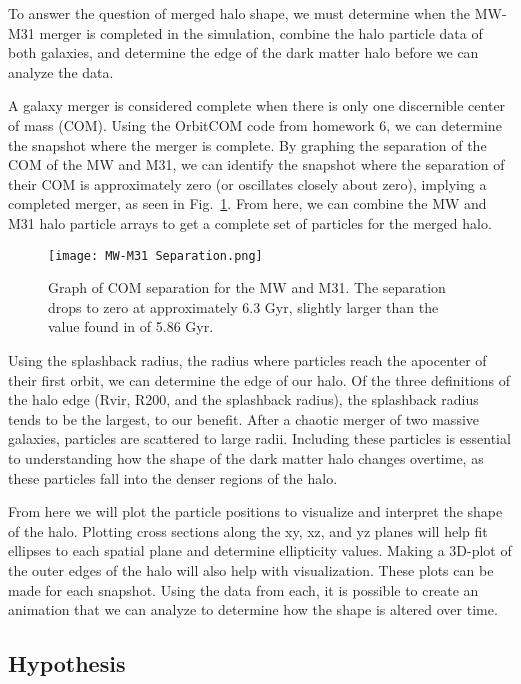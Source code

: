 \documentclass[fleqn,usenatbib]{mnras}
\begin{document}
To answer the question of merged halo shape, we must determine when the MW-M31 merger is completed in the simulation, combine the halo particle data of both galaxies, and determine the edge of the dark matter halo before we can analyze the data.

A galaxy merger is considered complete when there is only one discernible center of mass (COM). Using the OrbitCOM code from homework 6, we can determine the snapshot where the merger is complete. By graphing the separation of the COM of the MW and M31, we can identify the snapshot where the separation of their COM is approximately zero (or oscillates closely about zero), implying a completed merger, as seen in Fig.~\ref{fig:COM separation}. From here, we can combine the MW and M31 halo particle arrays to get a complete set of particles for the merged halo.


\begin{figure}
	\texttt{[image: MW-M31 Separation.png]}
    \caption{Graph of COM separation for the MW and M31. The separation drops to zero at approximately 6.3 Gyr, slightly larger than the value found in \citet{van_der_Marel_2012} of 5.86 Gyr.}
    \label{fig:COM separation}
\end{figure}

Using the splashback radius, the radius where particles reach the apocenter of their first orbit, we can determine the edge of our halo. Of the three definitions of the halo edge (Rvir, R200, and the splashback radius), the splashback radius tends to be the largest, to our benefit. After a chaotic merger of two massive galaxies, particles are scattered to large radii. Including these particles is essential to understanding how the shape of the dark matter halo changes overtime, as these particles fall into the denser regions of the halo. 

From here we will plot the particle positions to visualize and interpret the shape of the halo. Plotting cross sections along the xy, xz, and yz planes will help fit ellipses to each spatial plane and determine ellipticity values. Making a 3D-plot of the outer edges of the halo will also help with visualization. These plots can be made for each snapshot. Using the data from each, it is possible to create an animation that we can analyze to determine how the shape is altered over time. 

\subsection{Hypothesis}
\end{document}
